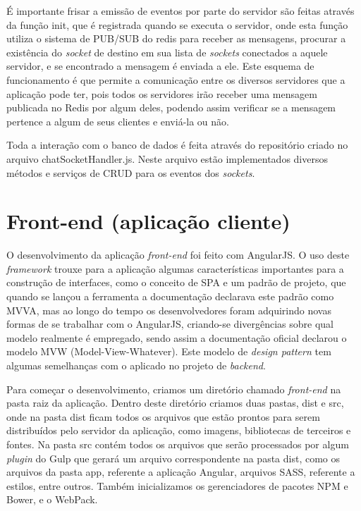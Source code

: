 É importante frisar a emissão de eventos por parte do servidor são feitas através da função init, que é registrada quando se executa o servidor, onde esta função utiliza o sistema de PUB/SUB do redis para receber as mensagens, procurar a existência do \textit{socket} de destino em sua lista de \textit{sockets} conectados a aquele servidor, e se encontrado a mensagem é enviada a ele. Este esquema de funcionamento é que permite a comunicação entre os diversos servidores que a aplicação pode ter, pois todos os servidores irão receber uma mensagem publicada no Redis por algum deles, podendo assim verificar se a mensagem pertence a algum de seus clientes e enviá-la ou não.

Toda a interação com o banco de dados é feita através do repositório criado no arquivo chatSocketHandler.js. Neste arquivo estão implementados diversos métodos e serviços de CRUD para os eventos dos \textit{sockets}.

\section{Front-end (aplicação cliente)}
O desenvolvimento da aplicação \textit{front-end} foi feito com AngularJS. O uso deste \textit{framework} trouxe para a aplicação algumas características importantes para a construção de interfaces, como o conceito de SPA e um padrão de projeto, que quando se lançou a ferramenta a documentação declarava este padrão como MVVA, mas ao longo do tempo os desenvolvedores foram adquirindo novas formas de se trabalhar com o AngularJS, criando-se divergências sobre qual modelo realmente é empregado, sendo assim a documentação oficial declarou o modelo MVW (Model-View-Whatever). Este modelo de \textit{design pattern} tem algumas semelhanças com o aplicado no projeto de \textit{backend}.

Para começar o desenvolvimento, criamos um diretório chamado \textit{front-end} na pasta raiz da aplicação. Dentro deste diretório criamos duas pastas, dist e src, onde na pasta dist ficam todos os arquivos que estão prontos para serem distribuídos pelo servidor da aplicação, como imagens, bibliotecas de terceiros e fontes. Na pasta src contém todos os arquivos que serão processados por algum \textit{plugin} do Gulp que gerará um arquivo correspondente na pasta dist, como os arquivos da pasta app, referente a aplicação Angular, arquivos SASS, referente a estilos, entre outros. Também inicializamos os gerenciadores de pacotes NPM e Bower, e o WebPack.

